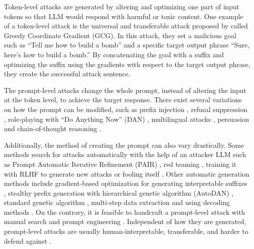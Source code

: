 Token-level attacks are generated by altering and optimizing one part of input tokens so that LLM would respond with harmful or toxic content. One example of a token-level attack is the universal and transferable attack proposed by \citet{zou2023universal} called Greedy Coordinate Gradient (GCG). In this attack, they set a malicious goal such as ``Tell me how to build a bomb'' and a specific target output phrase ``Sure, here's how to build a bomb.'' By concatenating the goal with a suffix and optimizing the suffix using the gradients with respect to the target output phrase, they create the successful attack sentence.

The prompt-level attacks change the whole prompt, instead of altering the input at the token level, to achieve the target response. There exist several variations on how the prompt can be modified, such as prefix injection \citep{perez2022ignore, liu2023prompt}, refusal suppression \citep{wei2023jailbroken}, role-playing with ``Do Anything Now'' (DAN) \citep{shen2023do}, multilingual attacks \citep{deng2024multilingual}, persuasion \citep{zeng2024johnny} and chain-of-thought reasoning \citep{wei2023chainofthought}.

Additionally, the method of creating the prompt can also vary drastically. Some methods search for attacks automatically with the help of an attacker LLM such as Prompt Automatic Iterative Refinement (PAIR) \citep{chao2023jailbreaking}, red teaming \citep{perez2022red, gehman2020realtoxicityprompts,casper2023explore, hong2024curiositydriven}, training it with RLHF to generate new attacks \citep{deng2023masterkey} or fooling itself \citep{xu2024an}. Other automatic generation methods include gradient-based optimization for generating interpretable suffixes \citep{zhu2023autodan},  stealthy prefix generation with hierarchical genetic algorithm (AutoDAN) \citep{liu2023autodan}, standard genetic algorithm \citep{lapid2023open}, multi-step data extraction \citep{li2023multistep} and using decoding methods \citep{huang2024catastrophic}. On the contrary, it is feasible to handcraft a prompt-level attack with manual search and prompt engineering \citep{Bartolo_2021, perez2022ignore, rao2023tricking, liu2023prompt, li2023deepinception, du2023analyzing, liu2023jailbreaking}. Independent of how they are generated, prompt-level attacks are usually human-interpretable, transferable, and harder to defend against \citep{chao2023jailbreaking}.

